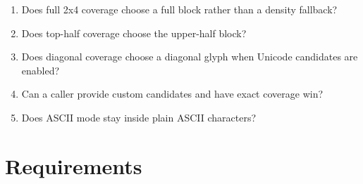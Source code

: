 \begin{enumerate}
\def\labelenumi{\arabic{enumi}.}
\tightlist
\item
  Does full 2x4 coverage choose a full block rather than a density fallback?
\item
  Does top-half coverage choose the upper-half block?
\item
  Does diagonal coverage choose a diagonal glyph when Unicode candidates are enabled?
\item
  Can a caller provide custom candidates and have exact coverage win?
\item
  Does ASCII mode stay inside plain ASCII characters?
\end{enumerate}

\section{Requirements}\label{record-160-requirements}


